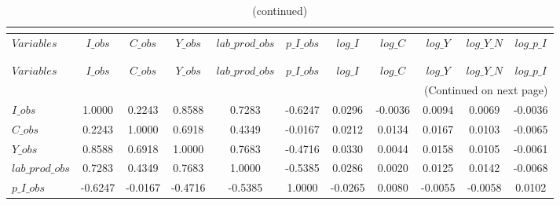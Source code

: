  
\begin{center}
\begin{longtable}{lcccccccccc} 
\caption{MATRIX OF CORRELATIONS}\\
 \label{Table:th_corr_matrix}\\
\toprule 
$Variables       $	 & 	 $           I\_obs$	 & 	 $           C\_obs$	 & 	 $           Y\_obs$	 & 	 $  lab\_prod\_obs$	 & 	 $       p\_I\_obs$	 & 	 $           log\_I$	 & 	 $           log\_C$	 & 	 $           log\_Y$	 & 	 $       log\_Y\_N$	 & 	 $       log\_p\_I$\\
\midrule \endfirsthead 
\caption{(continued)}\\
 \toprule \\ 
$Variables       $	 & 	 $           I\_obs$	 & 	 $           C\_obs$	 & 	 $           Y\_obs$	 & 	 $  lab\_prod\_obs$	 & 	 $       p\_I\_obs$	 & 	 $           log\_I$	 & 	 $           log\_C$	 & 	 $           log\_Y$	 & 	 $       log\_Y\_N$	 & 	 $       log\_p\_I$\\
\midrule \endhead 
\midrule \multicolumn{11}{r}{(Continued on next page)} \\ \bottomrule \endfoot 
\bottomrule \endlastfoot 
$I\_obs          $	 & 	            1.0000	 & 	            0.2243	 & 	            0.8588	 & 	            0.7283	 & 	           -0.6247	 & 	            0.0296	 & 	           -0.0036	 & 	            0.0094	 & 	            0.0069	 & 	           -0.0036 \\ 
$C\_obs          $	 & 	            0.2243	 & 	            1.0000	 & 	            0.6918	 & 	            0.4349	 & 	           -0.0167	 & 	            0.0212	 & 	            0.0134	 & 	            0.0167	 & 	            0.0103	 & 	           -0.0065 \\ 
$Y\_obs          $	 & 	            0.8588	 & 	            0.6918	 & 	            1.0000	 & 	            0.7683	 & 	           -0.4716	 & 	            0.0330	 & 	            0.0044	 & 	            0.0158	 & 	            0.0105	 & 	           -0.0061 \\ 
$lab\_prod\_obs  $	 & 	            0.7283	 & 	            0.4349	 & 	            0.7683	 & 	            1.0000	 & 	           -0.5385	 & 	            0.0286	 & 	            0.0020	 & 	            0.0125	 & 	            0.0142	 & 	           -0.0068 \\ 
$p\_I\_obs       $	 & 	           -0.6247	 & 	           -0.0167	 & 	           -0.4716	 & 	           -0.5385	 & 	            1.0000	 & 	           -0.0265	 & 	            0.0080	 & 	           -0.0055	 & 	           -0.0058	 & 	            0.0102 \\ 

\end{longtable}
\end{center}
